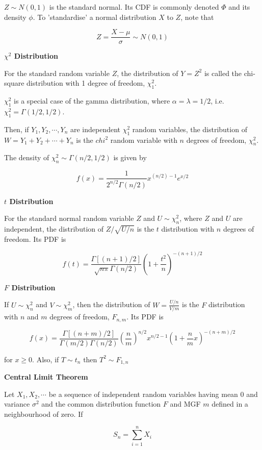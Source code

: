\documentclass[a4paper]{article}
\newcommand{\subheading}[1]{{\scriptsize\textbf{#1}}}
\begin{document}
\begin{multicols*}{4}
$Z \sim N(0, 1)$ is the standard normal. Its CDF is commonly denoted $\Phi$ and
its density $\phi$. To 'standardise' a normal distribution $X$ to $Z$, note that

$$Z = \frac{X - \mu}{\sigma} \sim N(0, 1)$$

\subheading{$\chi^2$ Distribution}

For the standard random variable $Z$, the distribution of $Y = Z^2$ is called
the chi-square distribution with 1 degree of freedom, $\chi^2_1$. \smallskip

$\chi^2_1$ is a special case of the gamma distribution, where $\alpha = \lambda
= 1/2$, i.e. $\chi^2_1 = \Gamma(1/2, 1/2)$. \smallskip

Then, if $Y_1, Y_2, \cdots, Y_n$ are independent $\chi^2_1$ random variables,
the distribution of $W = Y_1 + Y_2 + \cdots + Y_n$ is the $chi^2$ random
variable with $n$ degrees of freedom, $\chi^2_n$. \smallskip

The density of $\chi^2_n \sim \Gamma(n/2, 1/2)$ is given by

$$f(x) = \frac{1}{2^{n/2} \Gamma(n/2)} x^{(n/2) - 1} e^{x/2}$$

\subheading{$t$ Distribution}

For the standard normal random variable $Z$ and $U \sim \chi^2_n$, where $Z$ and
$U$ are independent, the distribution of $Z / \sqrt{U/n}$ is the $t$
distribution with $n$ degrees of freedom. Its PDF is

$$f(t) = \frac{\Gamma[(n+1)/2]}{\sqrt{n\pi}\Gamma(n/2)}
  \left ( 1 + \frac{t^2}{n} \right )^{-(n+1)/2} $$

\subheading{$F$ Distribution}

If $U \sim \chi^2_n$ and $V \sim \chi^2_m$, then the distribution of $W =
\frac{U/n}{V/m}$ is the $F$ distribution with $n$ and $m$ degrees of freedom,
$F_{n, m}$. Its PDF is

{\tiny
$$f(x) = \frac{\Gamma[(n+m)/2]}{\Gamma(m/2)\Gamma(n/2)}
  \left ( \frac{n}{m} \right )^{n/2}
  x^{n/2 -1}
  \left (1 + \frac{n}{m}x \right )^{-(n+m)/2}$$
}

for $x \geq 0$. Also, if $T \sim t_n$ then $T^2 \sim F_{1,n}$ \smallskip

\subheading{Central Limit Theorem}

Let $X_1, X_2, \cdots$ be a sequence of independent random variables having mean
0 and variance $\sigma^2$ and the common distribution function $F$ and MGF $m$
defined in a neighbourhood of zero. If

$$S_n = \sum^n_{i=1} X_i$$


\end{multicols*}
\end{document}
